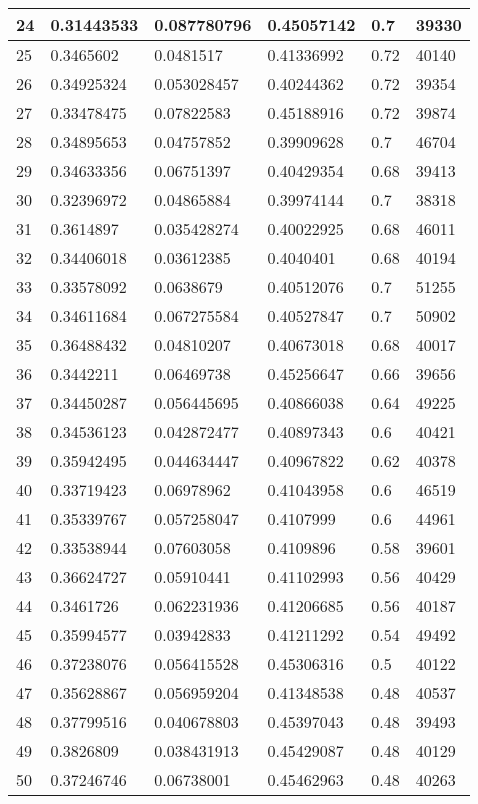 \begin{longtable}{|l|l|l|l|l|l|}
24 & 0.31443533 & 0.087780796 & 0.45057142 & 0.7 & 39330 \\ \hline 
25 & 0.3465602 & 0.0481517 & 0.41336992 & 0.72 & 40140 \\ \hline 
26 & 0.34925324 & 0.053028457 & 0.40244362 & 0.72 & 39354 \\ \hline 
27 & 0.33478475 & 0.07822583 & 0.45188916 & 0.72 & 39874 \\ \hline 
28 & 0.34895653 & 0.04757852 & 0.39909628 & 0.7 & 46704 \\ \hline 
29 & 0.34633356 & 0.06751397 & 0.40429354 & 0.68 & 39413 \\ \hline 
30 & 0.32396972 & 0.04865884 & 0.39974144 & 0.7 & 38318 \\ \hline 
31 & 0.3614897 & 0.035428274 & 0.40022925 & 0.68 & 46011 \\ \hline 
32 & 0.34406018 & 0.03612385 & 0.4040401 & 0.68 & 40194 \\ \hline 
33 & 0.33578092 & 0.0638679 & 0.40512076 & 0.7 & 51255 \\ \hline 
34 & 0.34611684 & 0.067275584 & 0.40527847 & 0.7 & 50902 \\ \hline 
35 & 0.36488432 & 0.04810207 & 0.40673018 & 0.68 & 40017 \\ \hline 
36 & 0.3442211 & 0.06469738 & 0.45256647 & 0.66 & 39656 \\ \hline 
37 & 0.34450287 & 0.056445695 & 0.40866038 & 0.64 & 49225 \\ \hline 
38 & 0.34536123 & 0.042872477 & 0.40897343 & 0.6 & 40421 \\ \hline 
39 & 0.35942495 & 0.044634447 & 0.40967822 & 0.62 & 40378 \\ \hline 
40 & 0.33719423 & 0.06978962 & 0.41043958 & 0.6 & 46519 \\ \hline 
41 & 0.35339767 & 0.057258047 & 0.4107999 & 0.6 & 44961 \\ \hline 
42 & 0.33538944 & 0.07603058 & 0.4109896 & 0.58 & 39601 \\ \hline 
43 & 0.36624727 & 0.05910441 & 0.41102993 & 0.56 & 40429 \\ \hline 
44 & 0.3461726 & 0.062231936 & 0.41206685 & 0.56 & 40187 \\ \hline 
45 & 0.35994577 & 0.03942833 & 0.41211292 & 0.54 & 49492 \\ \hline 
46 & 0.37238076 & 0.056415528 & 0.45306316 & 0.5 & 40122 \\ \hline 
47 & 0.35628867 & 0.056959204 & 0.41348538 & 0.48 & 40537 \\ \hline 
48 & 0.37799516 & 0.040678803 & 0.45397043 & 0.48 & 39493 \\ \hline 
49 & 0.3826809 & 0.038431913 & 0.45429087 & 0.48 & 40129 \\ \hline 
50 & 0.37246746 & 0.06738001 & 0.45462963 & 0.48 & 40263 \\ \hline 
\end{longtable}